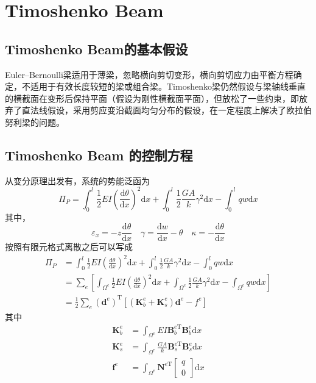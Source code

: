 \documentclass[forprint]{WHUBachelor}
\begin{document}
\section{Timoshenko Beam}
\subsection{Timoshenko Beam的基本假设}
Euler–Bernoulli梁适用于薄梁，忽略横向剪切变形，横向剪切应力由平衡方程确定，不适用于有效长度较短的梁或组合梁。Timoshenko梁仍然假设与梁轴线垂直的横截面在变形后保持平面（假设为刚性横截面平面），但放松了一些约束，即放弃了直法线假设，采用剪应变沿截面均匀分布的假设，在一定程度上解决了欧拉伯努利梁的问题。
\subsection{Timoshenko Beam 的控制方程}
从变分原理出发有，系统的势能泛函为
\begin{equation} 
\Pi_{P}=\int_{0}^{l} \frac{1}{2} E I\left(\frac{\mathrm{d} \theta}{\mathrm{d} x}\right)^{2} \mathrm{d} x+\int_{0}^{l} \frac{1}{2} \frac{G A}{k} \gamma^{2} \mathrm{d} x-\int_{0}^{l} q w \mathrm{d} x
 \end{equation}
其中，
\begin{equation} 
\varepsilon_{x}=-z \frac{\mathrm{d} \theta}{\mathrm{d} x} \quad \gamma=\frac{\mathrm{d} w}{\mathrm{d} x}-\theta \quad \kappa=-\frac{\mathrm{d} \theta}{\mathrm{d} x}
 \end{equation}
按照有限元格式离散之后可以写成
\begin{equation} 
\begin{aligned} \Pi_{P} &=\int_{0}^{l} \frac{1}{2} E I\left(\frac{\mathrm{d} \theta}{\mathrm{d} x}\right)^{2} \mathrm{d} x+\int_{0}^{l} \frac{1}{2} \frac{G A}{k} \gamma^{2} \mathrm{d} x-\int_{0}^{l} q w \mathrm{d} x \\ &=\sum_{e}\left[\int_{\Omega^{e}} \frac{1}{2} E I\left(\frac{\mathrm{d} \theta}{\mathrm{d} x}\right)^{2} \mathrm{d} x+\int_{\Omega^{e}} \frac{1}{2} \frac{G A}{k} \gamma^{2} \mathrm{d} x-\int_{\Omega^{e}} q w \mathrm{d} x\right] \\ &=\frac{1}{2} \sum_{e}\left(\boldsymbol{d}^{e}\right)^{\mathrm{T}}\left[\left(\boldsymbol{K}_{b}^{e}+\boldsymbol{K}_{s}^{e}\right) \boldsymbol{d}^{e}-f^{e}\right] \end{aligned}
 \end{equation}
其中
\begin{equation} 
\begin{aligned} \boldsymbol{K}_{b}^{e} &=\int_{\Omega^{e}} E I \boldsymbol{B}_{b}^{e \mathrm{T}} \boldsymbol{B}_{b}^{e} \mathrm{d} x \\ \boldsymbol{K}_{s}^{e} &=\int_{\Omega^{e}} \frac{G A}{k} \boldsymbol{B}_{s}^{e \mathrm{T}} \boldsymbol{B}_{s}^{e} \mathrm{d} x \\ \boldsymbol{f}^{e} &=\int_{\Omega^{e}} \boldsymbol{N}^{e \mathrm{T}}\left[\begin{array}{c}{q} \\ {0}\end{array}\right] \mathrm{d} x \end{aligned}
 \end{equation}
\end{document}

